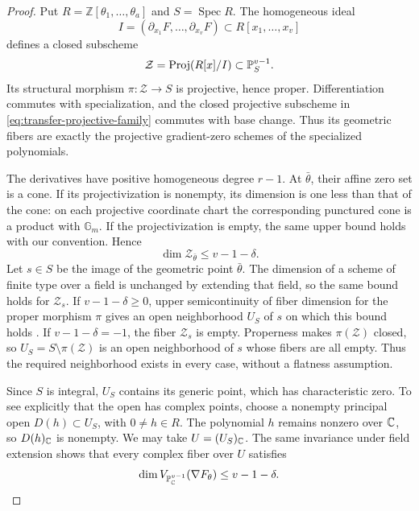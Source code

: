 \begin{proof}
Put \(R=\mathbb Z[\theta_1,\ldots,\theta_a]\) and
\(S=\operatorname{Spec}R\).  The homogeneous ideal
\[
 I=(\partial_{x_1}F,\ldots,\partial_{x_v}F)\subset R[x_1,\ldots,x_v]
\]
defines a closed subscheme
\begin{equation}
 \mathcal Z=\operatorname{Proj}(R[x]/I)\subset\mathbb P^{v-1}_S.
 \label{eq:transfer-projective-family}
\end{equation}
Its structural morphism \(\pi:\mathcal Z\to S\) is projective, hence proper.
Differentiation commutes with specialization, and the closed projective
subscheme in \eqref{eq:transfer-projective-family} commutes with base
change.  Thus its geometric fibers are exactly the projective
gradient-zero schemes of the specialized polynomials.

The derivatives have positive homogeneous degree \(r-1\).
At \(\bar\theta\), their affine zero set is a cone.  If its
projectivization is nonempty, its dimension is one less than that of the
cone: on each projective coordinate chart the corresponding punctured
cone is a product with \(\mathbb G_m\).  If the projectivization is
empty, the same upper bound holds with our convention.  Hence
\[
 \dim\mathcal Z_{\bar\theta}\le v-1-\delta.
\]
Let \(s\in S\) be the image of the geometric point \(\bar\theta\).
The dimension of a scheme of finite type over a field is unchanged by
extending that field, so the same bound holds for \(\mathcal Z_s\).
If \(v-1-\delta\ge0\), upper semicontinuity of fiber dimension for the
proper morphism \(\pi\) gives an open neighborhood \(U_S\) of \(s\)
on which this bound holds \cite[Tag~0D4I]{StacksProject}.
If \(v-1-\delta=-1\), the fiber \(\mathcal Z_s\) is empty.
Properness makes \(\pi(\mathcal Z)\) closed, so
\(U_S=S\setminus\pi(\mathcal Z)\) is an open neighborhood of \(s\)
whose fibers are all empty.  Thus the required neighborhood exists
in every case, without a flatness assumption.

Since \(S\) is integral, \(U_S\) contains its generic point, which has
characteristic zero.  To see explicitly that the open has
complex points, choose a nonempty principal open
\(D(h)\subset U_S\), with \(0\ne h\in R\).  The polynomial \(h\)
remains nonzero over \(\mathbb C\), so \(D(h)_\mathbb C\) is nonempty.  We may take
\(U=(U_S)_\mathbb C\).  The same invariance under field extension shows that
every complex fiber over \(U\) satisfies
\begin{equation}
 \dim V_{\mathbb P^{v-1}_{\mathbb C}}(\nabla F_\theta)
 \le v-1-\delta.
 \label{eq:transfer-complex-gradient}
\end{equation}


\end{proof}
